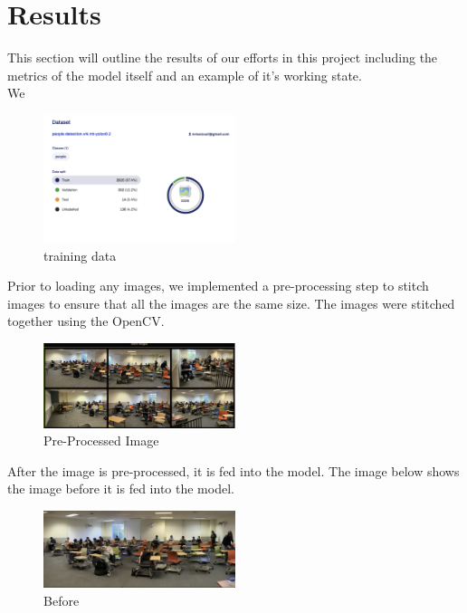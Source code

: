 \section{Results}
\label{sec:results}

This section will outline the results of our efforts in this project including the metrics of the model itself and an example of it's working state. \\

We
\begin{figure}[h]
    \centering
    \includegraphics[width=0.5\textwidth]{images/train.png}
    \caption{training data}
    \label{fig:data}
\end{figure}

Prior to loading any images, we implemented a pre-processing step to stitch images to ensure that all the images are the same size. The images were stitched together using the OpenCV. \\
\begin{figure}[h]
    \centering
    \includegraphics[width=0.5\textwidth]{images/Pre.png}
    \caption{Pre-Processed Image}
    \label{fig:before}
\end{figure}

After the image is pre-processed, it is fed into the model. The image below shows the image before it is fed into the model. \\
\begin{figure}[h]
    \centering
    \includegraphics[width=0.5\textwidth]{images/Before.png}
    \caption{Before}
    \label{fig:before}
\end{figure}

